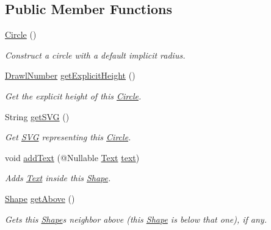 \subsection*{Public Member Functions}
\begin{DoxyCompactItemize}
\item 
\hyperlink{classcom_1_1aarrelaakso_1_1drawl_1_1_circle_a18cd01a953d72d49941bc8211f50d268}{Circle} ()
\begin{DoxyCompactList}\small\item\em Construct a circle with a default implicit radius. \end{DoxyCompactList}\item 
\hyperlink{classcom_1_1aarrelaakso_1_1drawl_1_1_drawl_number}{Drawl\+Number} \hyperlink{classcom_1_1aarrelaakso_1_1drawl_1_1_circle_a7754ee3923393a342e734a91bd094d25}{get\+Explicit\+Height} ()
\begin{DoxyCompactList}\small\item\em Get the explicit height of this \hyperlink{classcom_1_1aarrelaakso_1_1drawl_1_1_circle}{Circle}. \end{DoxyCompactList}\item 
String \hyperlink{classcom_1_1aarrelaakso_1_1drawl_1_1_circle_adc826cc2d93eb4e78318035c86d00f03}{get\+S\+VG} ()
\begin{DoxyCompactList}\small\item\em Get \hyperlink{classcom_1_1aarrelaakso_1_1drawl_1_1_s_v_g}{S\+VG} representing this \hyperlink{classcom_1_1aarrelaakso_1_1drawl_1_1_circle}{Circle}. \end{DoxyCompactList}\item 
void \hyperlink{classcom_1_1aarrelaakso_1_1drawl_1_1_shape_a9784264f6abcf623b2774d6ef2a53fdc}{add\+Text} (@Nullable \hyperlink{classcom_1_1aarrelaakso_1_1drawl_1_1_text}{Text} \hyperlink{classcom_1_1aarrelaakso_1_1drawl_1_1_shape_ab54afc2d95d3447532f5ecf3fec3faa8}{text})
\begin{DoxyCompactList}\small\item\em Adds \hyperlink{classcom_1_1aarrelaakso_1_1drawl_1_1_text}{Text} inside this \hyperlink{classcom_1_1aarrelaakso_1_1drawl_1_1_shape}{Shape}. \end{DoxyCompactList}\item 
\hyperlink{classcom_1_1aarrelaakso_1_1drawl_1_1_shape}{Shape} \hyperlink{classcom_1_1aarrelaakso_1_1drawl_1_1_shape_acebea2aa57031322323c9bf50ee447db}{get\+Above} ()
\begin{DoxyCompactList}\small\item\em Gets this \hyperlink{classcom_1_1aarrelaakso_1_1drawl_1_1_shape}{Shape}\textquotesingle{}s neighbor above (this \hyperlink{classcom_1_1aarrelaakso_1_1drawl_1_1_shape}{Shape} is below that one), if any. \end{DoxyCompactList}\item 

\end{DoxyCompactItemize}
